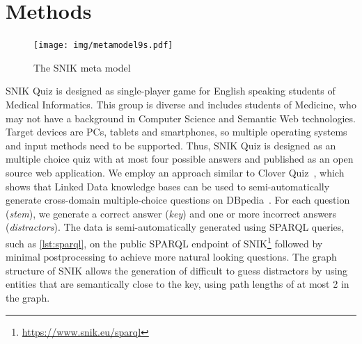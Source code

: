 \documentclass{IOS-Book-Article}     %
\newcommand{\citep}{\cite}%
\begin{document}
\section{Methods}
\begin{figure}
\caption{The SNIK meta model}
\label{fig:metamodel}
\centering
\texttt{[image: img/metamodel9s.pdf]}
\end{figure}
SNIK Quiz is designed as single-player game for English speaking students of Medical Informatics.
This group is diverse and includes students of Medicine, who may not have a background in Computer Science and Semantic Web technologies.
Target devices are PCs, tablets and smartphones, so multiple operating systems and input methods need to be supported.
Thus, SNIK Quiz is designed as an multiple choice quiz with at most four possible answers and published as an open source web application.
We employ an approach similar to Clover Quiz~\citep{cloverquiz}, which shows that Linked Data knowledge bases can be used to semi-automatically generate cross-domain multiple-choice questions on DBpedia~\citep{dbpedia}.
For each question (\emph{stem}), we generate a correct answer (\emph{key}) and one or more incorrect answers (\emph{distractors}).
The data is semi-automatically generated using SPARQL queries, such as \cref{lst:sparql}, on the public SPARQL endpoint of SNIK\footnote{\url{https://www.snik.eu/sparql}} followed by minimal postprocessing to achieve more natural looking questions.
The graph structure of SNIK allows the generation of difficult to guess distractors by using entities that are semantically close to the key, using path lengths of at most 2 in the graph.

\end{document}
